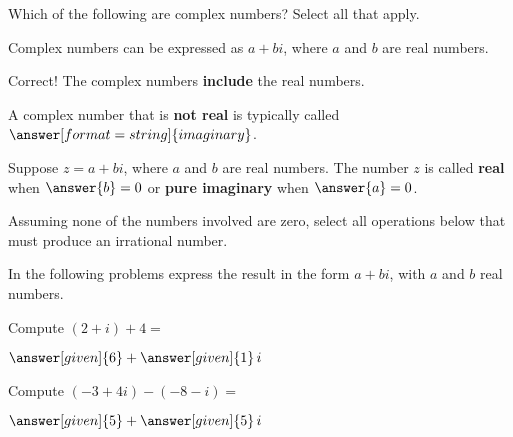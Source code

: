 \documentclass[nooutcomes]{ximera}
\begin{document}
\begin{problem}
Which of the following are complex numbers?  Select all that apply.

\begin{selectAll}
\end{selectAll}
\begin{hint}
Complex numbers can be expressed as $a+bi$, where $a$ and $b$ are real numbers.  
\end{hint}
\begin{problem}
Correct! The complex numbers \textbf{include} the real numbers.

A complex number that is \textbf{not real} is typically called 
$\answer[format=string]{imaginary}$. 

Suppose $z=a+bi$, where $a$ and $b$ are real numbers.  The number $z$ is called \textbf{real} when $\answer{b}=0$ or 
\textbf{pure imaginary} when $\answer{a}=0$.  
\end{problem}
\end{problem}


\begin{problem}
Assuming none of the numbers involved are zero, select all operations below that must produce an irrational number.

\begin{selectAll}
\end{selectAll}
\end{problem}

In the following problems express the result in the form $a+bi$, with $a$ and $b$ real numbers.  

\begin{problem}
Compute $(2+i) + 4 = $ 
\begin{prompt}
	$\answer[given]{6} + \answer[given]{1}\,i$
\end{prompt}
\end{problem}


\begin{problem}
Compute $(-3+4i) - (-8 - i) =$
\begin{prompt}
	$\answer[given]{5} + \answer[given]{5}\,i$
\end{prompt}
\end{problem}
\end{document}
